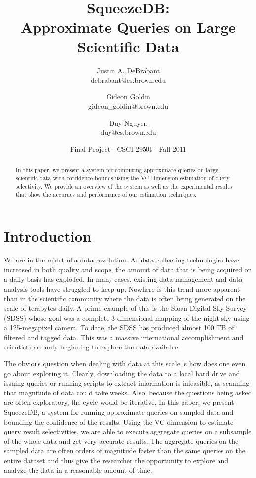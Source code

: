 \documentclass[11pt]{article}
\begin{document}
\title{SqueezeDB: \\ Approximate Queries on Large Scientific Data}
\author{Justin A. DeBrabant \\ debrabant@cs.brown.edu \and Gideon
  Goldin \\ gideon\_goldin@brown.edu \and Duy Nguyen \\ duy@cs.brown.edu}
\date{Final Project - CSCI 2950t - Fall 2011}
\maketitle

\begin{abstract}
In this paper, we present a system for computing approximate queries
on large scientific data with confidence bounds using the VC-Dimension
estimation of query selectivity. We provide an overview of the system
as well as the experimental results that show the accuracy and
performance of our estimation techniques. 
\end{abstract}

\section{Introduction}
\label{sec:intro}
We are in the midst of a data revolution. As data collecting
technologies have increased in both quality and scope, the amount of
data that is being acquired on a daily basis has exploded. In many
cases, existing data management and data analysis tools have struggled
to keep up. Nowhere is this trend more apparent than in the scientific
community where the data is often being generated on the scale of
terabytes daily. A prime example of this is the Sloan Digital Sky
Survey (SDSS) whose goal was a complete 3-dimensional mapping of the
night sky using a 125-megapixel camera. To date, the SDSS has produced
almost 100 TB of filtered and tagged data. This was a massive
international accomplishment and scientists are only beginning to
explore the data available. 

The obvious question when dealing with data at this scale is how does
one even go about exploring it. Clearly, downloading the data to a
local hard drive and issuing queries or running scripts to extract
information is infeasible, as scanning that magnitude of data could
take weeks. Also, because the questions being asked are often
exploratory, the cycle would be iterative. In this paper, we present
SqueezeDB, a system for running approximate queries on sampled data
and bounding the confidence of the results. Using the VC-dimension to
estimate query result selectivities, we are able to execute aggregate
queries on a subsample of the whole data and get very accurate
results. The aggregate queries on the sampled data are often orders of
magnitude faster than the same queries on the entire dataset and thus
give the researcher the opportunity to explore and analyze the data in
a reasonable amount of time.
\end{document}
